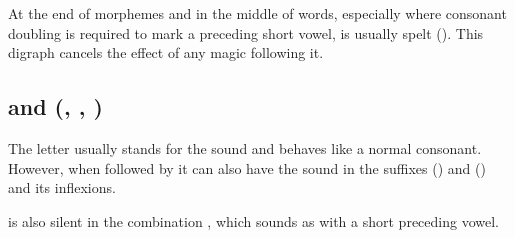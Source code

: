 At the end of morphemes and in the middle of words, especially where consonant
doubling is required to mark a preceding short vowel,  is usually spelt
 (). This digraph cancels the effect of any magic 
following it.

\subsection{ and  (, , )}

The letter  usually stands for the sound  and behaves like a normal
consonant. However, when followed by  it can also have the sound  in
the suffixes  () and  () and its inflexions.

 is also silent in the combination , which sounds as  with
a short preceding vowel.
